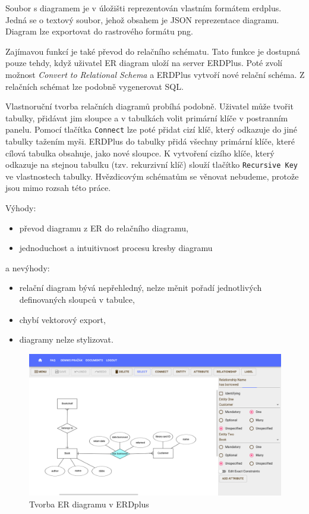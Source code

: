 Soubor s diagramem je v úložišti reprezentován vlastním formátem erdplus.
Jedná se o textový soubor, jehož obsahem je JSON reprezentace diagramu.
Diagram lze exportovat do rastrového formátu \acrshort{png}.

Zajímavou funkcí je také převod do relačního schématu.
Tato funkce je dostupná pouze tehdy, když uživatel ER diagram uloží na server ERDPlus.
Poté zvolí možnost \emph{Convert to Relational Schema} a ERDPlus vytvoří nové relační schéma.
Z relačních schémat lze podobně vygenerovat SQL.

Vlastnoruční tvorba relačních diagramů probíhá podobně.
Uživatel může tvořit tabulky, přidávat jim sloupce a v tabulkách volit primární klíče v postranním panelu.
Pomocí tlačítka \texttt{Connect} lze poté přidat cizí klíč, který odkazuje do jiné tabulky tažením myši.
ERDPlus do tabulky přidá všechny primární klíče, které cílová tabulka obsahuje, jako nové sloupce.
K vytvoření cizího klíče, který odkazuje na stejnou tabulku (tzv. rekurzivní klíč) slouží tlačítko \texttt{Recursive Key} ve vlastnostech tabulky.
Hvězdicovým schématům se věnovat nebudeme, protože jsou mimo rozsah této práce.

Výhody:
\begin{itemize}
  \item převod diagramu z ER do relačního diagramu,
  \item jednoduchost a intuitivnost procesu kresby diagramu
\end{itemize}
a nevýhody:
\begin{itemize}
  \item relační diagram bývá nepřehledný, nelze měnit pořadí jednotlivých definovaných sloupců v tabulce,
  \item chybí vektorový export,
  \item diagramy nelze stylizovat.
\end{itemize}

\begin{figure}[!htb]
  \centering
  \includegraphics[width = \maxwidth{\textwidth}]{../img/erdplus.png}
  \caption{Tvorba ER diagramu v ERDplus}
  \label{fig:erdplus}
\end{figure}

